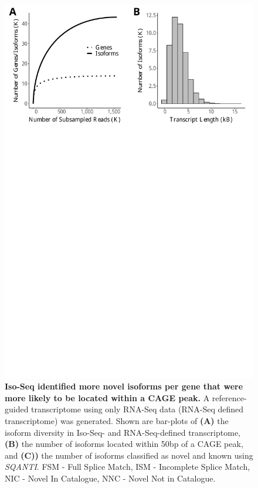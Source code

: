 \begin{figure}[htp]
	\begin{center}
		\includegraphics[page=9,trim={0 13cm 0 0},scale = 0.55]{Figures/IsoSeqWholeTranscriptome.pdf}
	\end{center}
	\captionsetup{width=0.95\textwidth}
	\caption[Comparison of Iso-Seq-defined and RNA-Seq-defined transcriptome]%
	{\textbf{Iso-Seq identified more novel isoforms per gene that were more likely to be located within a CAGE peak.} A reference-guided transcriptome using only RNA-Seq data (RNA-Seq defined transcriptome) was generated. Shown are bar-plots of \textbf{(A)} the isoform diversity in Iso-Seq- and RNA-Seq-defined transcriptome, \textbf{(B)} the number of isoforms located within 50bp of a CAGE peak, and \textbf{(C))} the number of isoforms classified as novel and known using \textit{SQANTI}. FSM - Full Splice Match, ISM - Incomplete Splice Match, NIC - Novel In Catalogue, NNC - Novel Not in Catalogue.}   
	\label{fig:isoseq_whole_rnaseqvsisoseq}
\end{figure}

